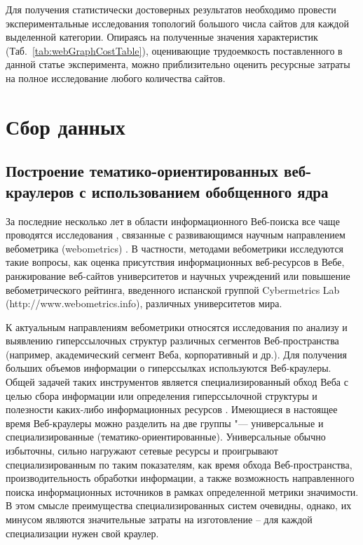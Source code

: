 Для получения статистически достоверных результатов необходимо провести экспериментальные исследования топологий большого числа сайтов для каждой выделенной категории. Опираясь на полученные значения характеристик (Таб.~\cref{tab:webGraphCostTable}), оценивающие трудоемкость поставленного в данной статье эксперимента, можно приблизительно оценить ресурсные затраты на полное исследование любого количества сайтов.

\section{Сбор данных}\label{sec:ch1/sec3}

\subsection{Построение тематико-ориентированных веб-краулеров с использованием обобщенного ядра}\label{subsec:ch1/sec3/sub1}

За последние несколько лет в области информационного Веб-поиска все чаще проводятся исследования \cite{Pechnikov,PechnikovLugovayaChuiko,PechnikovChirkovChuiko}, связанные с развивающимся научным направлением вебометрика (webometrics) \cite{PechnikovLugovayaChuiko}. В частности, методами вебометрики исследуются такие вопросы, как оценка присутствия информационных веб-ресурсов в Вебе, ранжирование веб-сайтов университетов и научных учреждений \cite{Pechnikov,PechnikovChirkovChuiko} или повышение вебометрического рейтинга, введенного испанской группой Cybermetrics Lab (http://www.webometrics.info), различных университетов мира.

К актуальным направлениям вебометрики относятся исследования по анализу и выявлению гиперссылочных структур различных сегментов Веб-пространства (например, академический сегмент Веба, корпоративный и др.). Для получения больших объемов информации о гиперссылках используются Веб-краулеры. Общей задачей таких инструментов является специализированный обход Веба с целью сбора информации или определения гиперссылочной структуры и полезности каких-либо информационных ресурсов \cite{BlekanovBondarenko1,BlekanovBondarenko2}. Имеющиеся в настоящее время Веб-краулеры можно разделить на две группы "--- универсальные и специализированные (тематико-ориентированные). Универсальные обычно избыточны, сильно нагружают сетевые ресурсы и проигрывают специализированным по таким показателям, как время обхода Веб-пространства, производительность обработки информации, а также возможность направленного поиска информационных источников в рамках определенной метрики значимости. В этом смысле преимущества специализированных систем очевидны, однако, их минусом являются значительные затраты на изготовление -- для каждой специализации нужен свой краулер.

